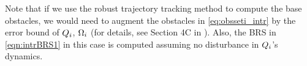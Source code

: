 \begin{remark}
Note that if we use the robust trajectory tracking method to compute the base obstacles, we would need to augment the obstacles in \eqref{eq:obsseti_intr} by the error bound of $Q_i$, $\Omega_i$ (for details, see Section 4C in \cite{Bansal2017}). Also, the BRS in \eqref{eqn:intrBRS1} in this case is computed assuming no disturbance in $Q_i$'s dynamics.
\end{remark}

